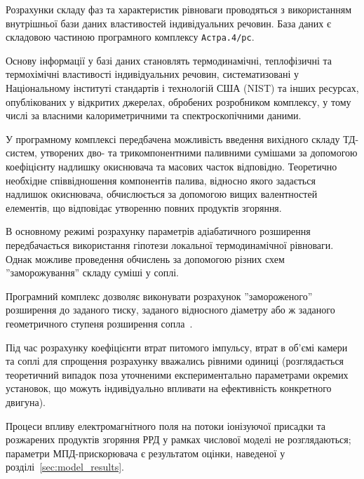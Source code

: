 Розрахунки складу фаз та характеристик рівноваги проводяться з використанням внутрішньої бази даних властивостей індивідуальних речовин. База даних є складовою частиною програмного комплексу \texttt{Астра.4/рс}.

Основу інформації у базі даних становлять термодинамічні, теплофізичні та термохімічні властивості індивідуальних речовин, систематизовані у Національному інституті стандартів і технологій США (NIST) та інших ресурсах, опублікованих у відкритих джерелах, обробених розробником комплексу, у тому числі за власними калориметричними та спектроскопічними даними.

У програмному комплексі передбачена можливість введення вихідного складу ТД-систем, утворених дво- та трикомпонентними паливними сумішами за допомогою коефіцієнту надлишку окиснювача та масових часток відповідно. Теоретично необхідне співвідношення компонентів палива, відносно якого задається надлишок окиснювача, обчислюється за допомогою вищих валентностей елементів, що відповідає утворенню повних продуктів згоряння. 

В основному режимі розрахунку параметрів адіабатичного розширення передбачається використання гіпотези локальної термодинамічної рівноваги. Однак можливе проведення обчислень за допомогою різних схем ''заморожування'' складу суміші у соплі.

Програмний комплекс дозволяє виконувати розрахунок ''замороженого'' розширення до заданого тиску, заданого відносного діаметру або ж заданого геометричного ступеня розширення сопла~\cite{Astra}.

Під час розрахунку коефіцієнти втрат питомого імпульсу, втрат в об'ємі камери та соплі для спрощення розрахунку вважались рівними одиниці (розглядається теоретичний випадок поза уточненими експериментально параметрами окремих установок, що можуть індивідуально впливати на ефективність конкретного двигуна).

Процеси впливу електромагнітного поля на потоки іонізуючої присадки та розжарених продуктів згоряння РРД у рамках числової моделі не розглядаються; параметри МПД-прискорювача є результатом оцінки, наведеної у розділі~\ref{sec:model_results}. 



